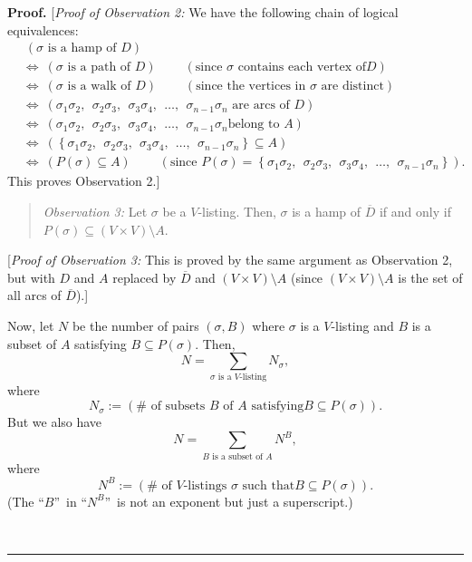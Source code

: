 \documentclass[numbers=enddot,12pt,final,onecolumn,notitlepage]{scrartcl}%
\numberwithin{exer}{subsection}
\theoremstyle{definition}
\newenvironment{statement}{\begin{quote}}{\end{quote}}
\newenvironment{proof}[1][Proof]{\noindent\textbf{#1.} }{\ \rule{0.5em}{0.5em}}
\let\sumnonlimits\sum
\renewcommand{\sum}{\sumnonlimits\limits}
\begin{document}
\begin{proof}
[\textit{Proof of Observation 2:} We have the following chain of logical
equivalences:%
\begin{align*}
&  \ \left(  \sigma\text{ is a hamp of }D\right) \\
&  \Longleftrightarrow\ \left(  \sigma\text{ is a path of }D\right)
\ \ \ \ \ \ \ \ \ \ \left(  \text{since }\sigma\text{ contains each vertex of
}D\right) \\
&  \Longleftrightarrow\ \left(  \sigma\text{ is a walk of }D\right)
\ \ \ \ \ \ \ \ \ \ \left(  \text{since the vertices in }\sigma\text{ are
distinct}\right) \\
&  \Longleftrightarrow\ \left(  \sigma_{1}\sigma_{2},\ \ \sigma_{2}\sigma
_{3},\ \ \sigma_{3}\sigma_{4},\ \ \ldots,\ \ \sigma_{n-1}\sigma_{n}\text{ are
arcs of }D\right) \\
&  \Longleftrightarrow\ \left(  \sigma_{1}\sigma_{2},\ \ \sigma_{2}\sigma
_{3},\ \ \sigma_{3}\sigma_{4},\ \ \ldots,\ \ \sigma_{n-1}\sigma_{n}\text{
belong to }A\right) \\
&  \Longleftrightarrow\ \left(  \left\{  \sigma_{1}\sigma_{2},\ \ \sigma
_{2}\sigma_{3},\ \ \sigma_{3}\sigma_{4},\ \ \ldots,\ \ \sigma_{n-1}\sigma
_{n}\right\}  \subseteq A\right) \\
&  \Longleftrightarrow\ \left(  P\left(  \sigma\right)  \subseteq A\right)
\ \ \ \ \ \ \ \ \ \ \left(  \text{since }P\left(  \sigma\right)  =\left\{
\sigma_{1}\sigma_{2},\ \ \sigma_{2}\sigma_{3},\ \ \sigma_{3}\sigma
_{4},\ \ \ldots,\ \ \sigma_{n-1}\sigma_{n}\right\}  \right)  .
\end{align*}
This proves Observation 2.]

\begin{statement}
\textit{Observation 3:} Let $\sigma$ be a $V$-listing. Then, $\sigma$ is a
hamp of $\overline{D}$ if and only if $P\left(  \sigma\right)  \subseteq
\left(  V\times V\right)  \setminus A$.
\end{statement}

[\textit{Proof of Observation 3:} This is proved by the same argument as
Observation 2, but with $D$ and $A$ replaced by $\overline{D}$ and $\left(
V\times V\right)  \setminus A$ (since $\left(  V\times V\right)  \setminus A$
is the set of all arcs of $\overline{D}$).] \medskip

Now, let $N$ be the number of pairs $\left(  \sigma,B\right)  $ where $\sigma$
is a $V$-listing and $B$ is a subset of $A$ satisfying $B\subseteq P\left(
\sigma\right)  $. Then,%
\begin{equation}
N=\sum_{\sigma\text{ is a }V\text{-listing}}N_{\sigma},
\label{pf.thm.hamp.Dbar.3}%
\end{equation}
where
\[
N_{\sigma}:=\left(  \#\text{ of subsets }B\text{ of }A\text{ satisfying
}B\subseteq P\left(  \sigma\right)  \right)  .
\]
But we also have%
\begin{equation}
N=\sum_{B\text{ is a subset of }A}N^{B}, \label{pf.thm.hamp.Dbar.4}%
\end{equation}
where%
\[
N^{B}:=\left(  \#\text{ of }V\text{-listings }\sigma\text{ such that
}B\subseteq P\left(  \sigma\right)  \right)  .
\]
(The \textquotedblleft$B$\textquotedblright\ in \textquotedblleft$N^{B}%
$\textquotedblright\ is not an exponent but just a superscript.)


\end{proof}
\end{document}
